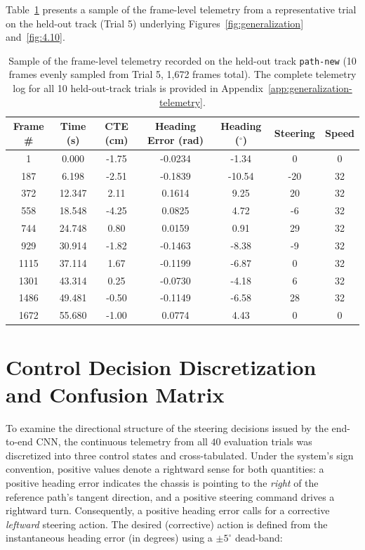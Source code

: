 Table~\ref{tab:generalization-telemetry-sample} presents a sample of the frame-level telemetry from a representative trial on the held-out track (Trial 5) underlying Figures~\ref{fig:generalization} and~\ref{fig:4.10}.

\begin{table}[H]
	\centering
	\caption{Sample of the frame-level telemetry recorded on the held-out track \texttt{path-new} (10 frames evenly sampled from Trial 5, 1,672 frames total). The complete telemetry log for all 10 held-out-track trials is provided in Appendix~\ref{app:generalization-telemetry}.}
	\label{tab:generalization-telemetry-sample}
	\begin{tabular}{c c c c c c c}
		\toprule
		Frame \# & Time (s) & CTE (cm) & Heading Error (rad) & Heading ($^{\circ}$) & Steering & Speed \\
		\midrule
		1    & 0.000  & -1.75 & -0.0234 & -1.34  & 0   & 0  \\
		187  & 6.198  & -2.51 & -0.1839 & -10.54 & -20 & 32 \\
		372  & 12.347 & 2.11  & 0.1614  & 9.25   & 20  & 32 \\
		558  & 18.548 & -4.25 & 0.0825  & 4.72   & -6  & 32 \\
		744  & 24.748 & 0.80  & 0.0159  & 0.91   & 29  & 32 \\
		929  & 30.914 & -1.82 & -0.1463 & -8.38  & -9  & 32 \\
		1115 & 37.114 & 1.67  & -0.1199 & -6.87  & 0   & 32 \\
		1301 & 43.314 & 0.25  & -0.0730 & -4.18  & 6   & 32 \\
		1486 & 49.481 & -0.50 & -0.1149 & -6.58  & 28  & 32 \\
		1672 & 55.680 & -1.00 & 0.0774  & 4.43   & 0   & 0  \\
		\bottomrule
	\end{tabular}
\end{table}

\FloatBarrier

\section{Control Decision Discretization and Confusion Matrix}
To examine the directional structure of the steering decisions issued by the end-to-end CNN, the continuous telemetry from all $40$ evaluation trials was discretized into three control states and cross-tabulated. Under the system's sign convention, positive values denote a rightward sense for both quantities: a positive heading error indicates the chassis is pointing to the \emph{right} of the reference path's tangent direction, and a positive steering command drives a rightward turn. Consequently, a positive heading error calls for a corrective \emph{leftward} steering action. The desired (corrective) action is defined from the instantaneous heading error (in degrees) using a $\pm 5^{\circ}$ dead-band:

